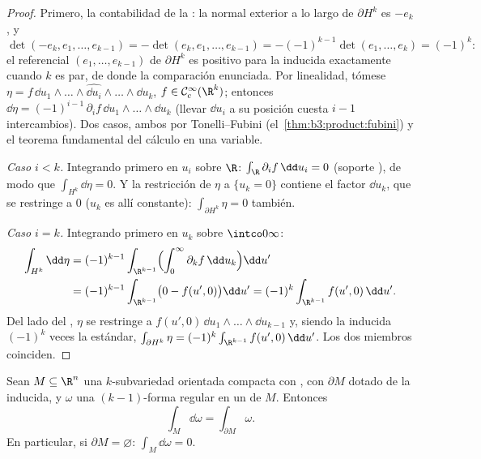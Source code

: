 \begin{proof}
Primero, la contabilidad de la
: la normal exterior a lo
largo de $\partial H^k$ es $-e_k$, y
\[
\det(-e_k, e_1, \dots, e_{k-1}) =
-\det(e_k, e_1, \dots, e_{k-1}) = -(-1)^{k-1}\det(e_1,
\dots, e_k) = (-1)^k :
\]
el referencial $(e_1, \dots, e_{k-1})$ de $\partial H^k$ es positivo
para la  inducida
exactamente cuando $k$ es par, de donde la comparación enunciada. Por
linealidad, tómese $\eta
= f\,\dd u_1\wedge\dots\wedge\widehat{\dd
u_i}\wedge\dots\wedge\dd u_k$, $f \in \mathcal
C^\infty_c(\R^k)$; entonces $\dd\eta =
(-1)^{i-1}\,\partial_if\,\dd u_1\wedge\dots\wedge\dd u_k$ (llevar
$\dd u_i$ a su posición cuesta $i - 1$ intercambios). Dos casos, ambos
por Tonelli--Fubini (el~\cref{thm:b3:product:fubini}) y el teorema
fundamental del cálculo en una variable.

\emph{Caso $i < k$.} Integrando primero en $u_i$ sobre $\R$:
$\int_\R\partial_if\,\dd u_i = 0$ (soporte
), de modo que
$\int_{H^k}\dd\eta = 0$. Y la restricción de $\eta$ a $\{u_k = 0\}$
contiene el factor $\dd u_k$, que se restringe a $0$ ($u_k$ es allí
constante): $\int_{\partial H^k}\eta =
0$ también.

\emph{Caso $i = k$.} Integrando primero en $u_k$ sobre
$\intco0\infty$:
\begin{align*}
\int_{H^k}\dd\eta &= (-1)^{k-1}\int_{\R^{k-1}}
\Bigl(\int_0^\infty\partial_kf\,\dd u_k\Bigr)\dd u' \\
&= (-1)^{k-1}\int_{\R^{k-1}}\bigl(0 - f(u', 0)\bigr)\dd u'
= (-1)^k\int_{\R^{k-1}}f(u',0)\,\dd u' .
\end{align*}
Del lado del , $\eta$ se restringe
a $f(u',
0)\,\dd u_1\wedge\dots\wedge\dd u_{k-1}$ y, siendo la
 inducida $(-1)^k$ veces
la estándar, $\int_{\partial H^k}\eta =
(-1)^k\int_{\R^{k-1}}f(u',0)\,\dd u'$. Los dos miembros coinciden.
\end{proof}

\begin{theorem}[Stokes]\label{thm:b3:forms:stokes}
Sean $M \subseteq \R^n$ una $k$-subvariedad orientada
compacta con
, con $\partial M$ dotado de la
 inducida, y $\omega$ una
$(k-1)$-forma regular en un 
de $M$. Entonces
\[
\int_M\dd\omega = \int_{\partial M}\omega .
\]
En particular, si $\partial M = \varnothing$:
$\int_M\dd\omega = 0$.
\end{theorem}

